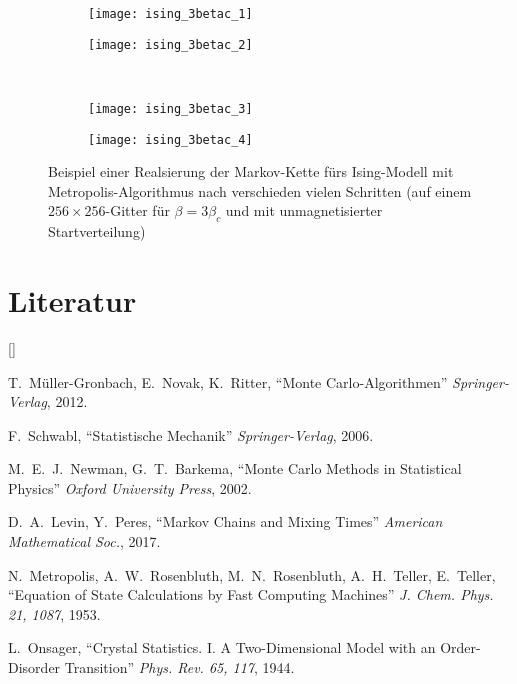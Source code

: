 \documentclass[twoside]{article}
\def\beginrefs{\begin{list}%
        {[\arabic{equation}]}{\usecounter{equation}
         \setlength{\leftmargin}{2.0truecm}\setlength{\labelsep}{0.4truecm}%
         \setlength{\labelwidth}{1.6truecm}}}
\def\endrefs{\end{list}}
\def\bibentry#1{\item[\hbox{[#1]}]}
\theoremstyle{definition}
\begin{document}
\begin{figure}
\centering
	\begin{subfigure}[t]{0.49 \textwidth}
	\vskip 0pt
		\centering
		\texttt{[image: ising\_3betac\_1]}
		\caption{}
		\label{fig:ising_3betac_1}		
	\end{subfigure}
	\begin{subfigure}[t]{0.49 \textwidth}
	\vskip 0pt
		\centering
		\texttt{[image: ising\_3betac\_2]}
		\caption{}\label{fig:ising_3betac_2}
	\end{subfigure}\\
		\begin{subfigure}[t]{0.49 \textwidth}
	\vskip 0pt
		\centering
		\texttt{[image: ising\_3betac\_3]}
		\caption{}
		\label{fig:ising_3betac_3}		
	\end{subfigure}
	\begin{subfigure}[t]{0.49 \textwidth}
	\vskip 0pt
		\centering
		\texttt{[image: ising\_3betac\_4]}
		\caption{}	
	\label{fig:ising_3betac_4}
	\end{subfigure}
\caption{Beispiel einer Realsierung der Markov-Kette fürs Ising-Modell mit Metropolis-Algorithmus nach verschieden vielen Schritten (auf einem $256\times 256$-Gitter für $\beta=3 \beta_c$ und mit unmagnetisierter Startverteilung)}
\label{fig:ising3}
\end{figure}
\newpage
\section*{Literatur}
\beginrefs
\bibentry{1}{\sc T.~Müller-Gronbach, E.~Novak, K.~Ritter}, 
``Monte Carlo-Algorithmen''
{\it Springer-Verlag},
2012.
\bibentry{2}{\sc F.~Schwabl}, 
``Statistische Mechanik''
{\it Springer-Verlag},
2006.
\bibentry{3}{\sc M.~E.~J.~Newman, G.~T.~Barkema}, 
``Monte Carlo Methods in Statistical Physics''
{\it Oxford University Press},
2002.
\bibentry{4}{\sc D.~A.~Levin, Y.~Peres}, 
``Markov Chains and Mixing Times''
{\it American Mathematical Soc.},
2017.
\bibentry{5}{\sc N.~Metropolis, A.~W.~Rosenbluth, M.~N.~Rosenbluth, A.~H.~Teller, E.~Teller}, 
``Equation of State Calculations by Fast Computing Machines''
{\it  J. Chem. Phys. 21, 1087},
1953.
\bibentry{6}{\sc L.~Onsager}, 
``Crystal Statistics. I. A Two-Dimensional Model with an Order-Disorder Transition''
{\it Phys. Rev. 65, 117},
1944.
\endrefs
\end{document}
